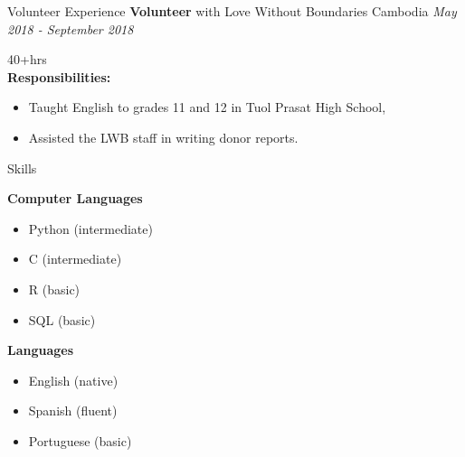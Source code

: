 \documentclass{resume} %
\begin{document}
\begin{rSection}{Volunteer Experience}
{\bf Volunteer} with Love Without Boundaries Cambodia \hfill {\em May 2018 - September 2018}\\
\strut\hfill{40+hrs}\\
{\bf Responsibilities:} 
\begin{itemize}
\item Taught English to grades 11 and 12 in Tuol Prasat High School, 
\item Assisted the LWB staff in writing donor reports.
\end{itemize}
\end{rSection}

\begin{rSection}{Skills}

{\bf Computer Languages}
\begin{itemize}
\item Python (intermediate)
\item C (intermediate)
\item R (basic)
\item SQL (basic)
\end{itemize}

{\bf Languages}
\begin{itemize}
\item English (native)
\item Spanish (fluent)
\item Portuguese (basic)
\end{itemize}

\end{rSection}
\end{document}
